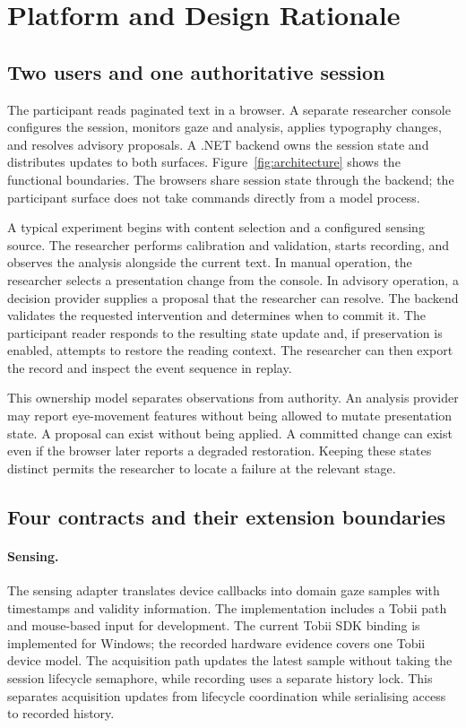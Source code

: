 \section{Platform and Design Rationale}
\label{sec:platform}

\subsection{Two users and one authoritative session}

The participant reads paginated text in a browser. A separate researcher console configures the session, monitors gaze and analysis, applies typography changes, and resolves advisory proposals. A .NET backend owns the session state and distributes updates to both surfaces. Figure~\ref{fig:architecture} shows the functional boundaries. The browsers share session state through the backend; the participant surface does not take commands directly from a model process.



A typical experiment begins with content selection and a configured sensing source. The researcher performs calibration and validation, starts recording, and observes the analysis alongside the current text. In manual operation, the researcher selects a presentation change from the console. In advisory operation, a decision provider supplies a proposal that the researcher can resolve. The backend validates the requested intervention and determines when to commit it. The participant reader responds to the resulting state update and, if preservation is enabled, attempts to restore the reading context. The researcher can then export the record and inspect the event sequence in replay.

This ownership model separates observations from authority. An analysis provider may report eye-movement features without being allowed to mutate presentation state. A proposal can exist without being applied. A committed change can exist even if the browser later reports a degraded restoration. Keeping these states distinct permits the researcher to locate a failure at the relevant stage.

\subsection{Four contracts and their extension boundaries}

\paragraph{Sensing.}
The sensing adapter translates device callbacks into domain gaze samples with timestamps and validity information. The implementation includes a Tobii path and mouse-based input for development. The current Tobii SDK binding is implemented for Windows; the recorded hardware evidence covers one Tobii device model. The acquisition path updates the latest sample without taking the session lifecycle semaphore, while recording uses a separate history lock. This separates acquisition updates from lifecycle coordination while serialising access to recorded history.

